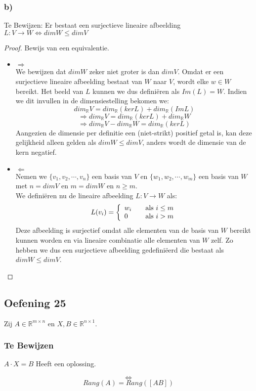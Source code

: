 \documentclass[lineaire_algebra_oplossingen.tex]{subfiles}
\begin{document}
\subsubsection*{b)}
Te Bewijzen:
Er bestaat een surjectieve lineaire afbeelding $L:V\rightarrow W \Leftrightarrow dimW\le dimV$
\begin{proof}
Bewijs van een equivalentie.
\begin{itemize}
\item $\Rightarrow$\\
We bewijzen dat $dimW$ zeker niet groter is dan $dimV$. Omdat er een surjectieve lineaire afbeelding bestaat van $W$ naar $V$, wordt elke $w\in W$ bereikt. Het beeld van $L$ kunnen we dus defini\"eren als $Im(L)=W$. Indien we dit invullen in de dimensiestelling bekomen we:
\[dim_{\mathbb{R}} V = dim_{\mathbb{R}} (kerL) + dim_{\mathbb{R}} (ImL)\]
\[\Rightarrow dim_{\mathbb{R}} V = dim_{\mathbb{R}} (kerL) + dim_{\mathbb{R}} W\]
\[\Rightarrow dim_{\mathbb{R}} V - dim_{\mathbb{R}} W= dim_{\mathbb{R}} (kerL)\]
Aangezien de dimensie per definitie een (niet-strikt) positief getal is, kan deze gelijkheid alleen gelden als $dim W \leq dim V$, anders wordt de dimensie van de kern negatief.
\item $\Leftarrow$\\
Nemen we $\{v_1,v_2,\cdots,v_n\}$ een basis van $V$ en $\{w_1,w_2,\cdots,w_m\}$ een basis van $W$ met $n=dim V$ en $m=dim W$ en $n \geq m$.\\
We defini\"eren nu de lineaire afbeelding $L:V \rightarrow W$ als:
\[ L(v_i) = \left\{
  \begin{array}{l l}
    w_i & \quad \text{als $i \leq m$}\\
    0 & \quad \text{als $i > m$}\\
  \end{array} \right.
\]
Deze afbeelding is surjectief omdat alle elementen van de basis van $W$ bereikt kunnen worden en via lineaire combinatie alle elementen van $W$ zelf. Zo hebben we dus een surjectieve afbeelding gedefini\"eerd die bestaat als $dim W \leq dim V$.
\end{itemize}
\end{proof}


\subsection{Oefening 25}
Zij $A \in \mathbb{R}^{m\times n}$ en $X,B \in \mathbb{R}^{n\times 1}$.

\subsubsection*{Te Bewijzen}
\begin{center}
$A\cdot X = B$ Heeft een oplossing.
\end{center}
\[\Leftrightarrow\]
\[Rang(A) = Rang([A B])\]
\end{document}
